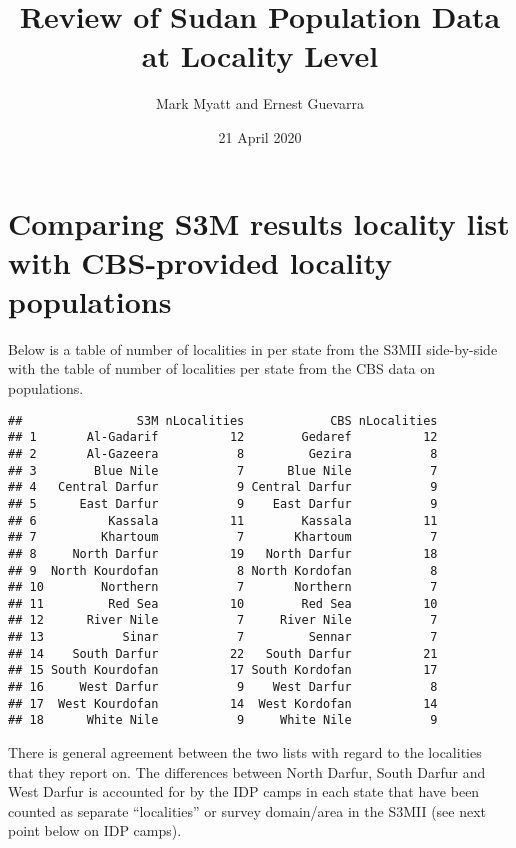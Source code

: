 \documentclass[12pt,a4paper]{article}
\title{\vspace{8cm} \LARGE{Review of Sudan Population Data at Locality Level}}
\author{Mark Myatt and Ernest Guevarra}
\date{21 April 2020}
\begin{document}
\maketitle

\newpage

\newpage

\hypertarget{comparing-s3m-results-locality-list-with-cbs-provided-locality-populations}{%
\section{Comparing S3M results locality list with CBS-provided locality populations}\label{comparing-s3m-results-locality-list-with-cbs-provided-locality-populations}}

Below is a table of number of localities in per state from the S3MII side-by-side with the table of number of localities per state from the CBS data on populations.

\begin{verbatim}
##                S3M nLocalities            CBS nLocalities
## 1       Al-Gadarif          12        Gedaref          12
## 2       Al-Gazeera           8         Gezira           8
## 3        Blue Nile           7      Blue Nile           7
## 4   Central Darfur           9 Central Darfur           9
## 5      East Darfur           9    East Darfur           9
## 6          Kassala          11        Kassala          11
## 7         Khartoum           7       Khartoum           7
## 8     North Darfur          19   North Darfur          18
## 9  North Kourdofan           8 North Kordofan           8
## 10        Northern           7       Northern           7
## 11         Red Sea          10        Red Sea          10
## 12      River Nile           7     River Nile           7
## 13           Sinar           7         Sennar           7
## 14    South Darfur          22   South Darfur          21
## 15 South Kourdofan          17 South Kordofan          17
## 16     West Darfur           9    West Darfur           8
## 17  West Kourdofan          14  West Kordofan          14
## 18      White Nile           9     White Nile           9
\end{verbatim}

There is general agreement between the two lists with regard to the localities that they report on. The differences between North Darfur, South Darfur and West Darfur is accounted for by the IDP camps in each state that have been counted as separate ``localities'' or survey domain/area in the S3MII (see next point below on IDP camps).
\end{document}
